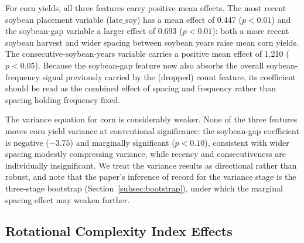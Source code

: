 \documentclass[12pt,letterpaper]{article}
\theoremstyle{remark}
\theoremstyle{remark}
\theoremstyle{plain}
\theoremstyle{definition}
\begin{document}
For corn yields, all three features carry positive mean effects. The most recent soybean placement variable ($\text{late\_soy}$) has a mean effect of 0.447 ($p<0.01$) and the soybean-gap variable a larger effect of 0.693 ($p<0.01$): both a more recent soybean harvest and wider spacing between soybean years raise mean corn yields. The consecutive-soybean-years variable carries a positive mean effect of 1.210 ($p<0.05$). Because the soybean-gap feature now also absorbs the overall soybean-frequency signal previously carried by the (dropped) count feature, its coefficient should be read as the combined effect of spacing and frequency rather than spacing holding frequency fixed.

The variance equation for corn is considerably weaker. None of the three features moves corn yield variance at conventional significance: the soybean-gap coefficient is negative ($-3.75$) and marginally significant ($p<0.10$), consistent with wider spacing modestly compressing variance, while recency and consecutiveness are individually insignificant. We treat the variance results as directional rather than robust, and note that the paper's inference of record for the variance stage is the three-stage bootstrap (Section~\ref{subsec:bootstrap}), under which the marginal spacing effect may weaken further.
 
\subsection{\label{subsec:rci_effects}Rotational Complexity Index Effects}
\end{document}
